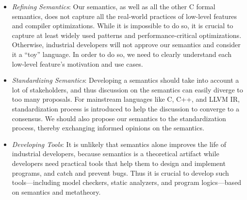 \begin{itemize}

\item \emph{Refining Semantics}: Our semantics, as well as all the other C formal semantics, does
  not capture all the real-world practices of low-level features and compiler optimizations.  While
  it is impossible to do so, it is crucial to capture at least widely used patterns and
  performance-critical optimizations.  Otherwise, industrial developers will not approve our
  semantics and consider it a ``toy'' language.  In order to do so, we need to clearly understand
  each low-level feature's motivation and use cases.

\item \emph{Standardizing Semantics}: Developing a semantics should take into account a lot of
  stakeholders, and thus discussion on the semantics can easily diverge to too many proposals.  For
  mainstream languages like C, C++, and LLVM IR, standardization process is introduced to help the
  discussion to converge to a consensus.  We should also propose our semantics to the
  standardization process, thereby exchanging informed opinions on the semantics.

\item \emph{Developing Tools}: It is unlikely that semantics alone improves the life of industrial
  developers, because semantics is a theoretical artifact while developers need practical tools that
  help them to design and implement programs, and catch and prevent bugs.  Thus it is crucial to
  develop such tools---including model checkers, static analyzers, and program logics---based on
  semantics and metatheory.

\end{itemize}





